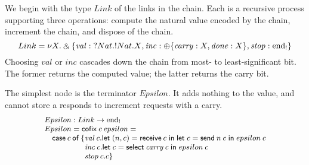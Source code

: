 \documentclass[orivec,envcountsame]{llncs}
\makeatletter
\newcommand{\with}{\mathbin\binampersand}
\newcommand{\gvout}[2]{{!#1.#2}}
\newcommand{\gvin}[2]{{?#1.#2}}
\newcommand{\outterm}{\mathrm{end}_!}
\newcommand{\mkwd}[1]{\mathsf{#1}}
\newcommand{\clabel}[1]{\mathit{#1}}
\newcommand{\gvsend}[2]{\mkwd{send}\:#1\:#2}
\newcommand{\gvreceive}[1]{\mkwd{receive}\:#1}
\newcommand{\gvlet}[3]{\mkwd{let}\;#1 = #2\;\mkwd{in}\;#3}
\newcommand{\gvselect}[2]{\mkwd{select}\:#1\:#2}
\newcommand{\lrkwd}{\mkwd{cofix}}
\newcommand{\ba}{\begin{array}}
\newcommand{\ea}{\end{array}}
\newcommand{\bl}{\ba[t]{@{}l@{}}}
\newcommand{\el}{\ea}
\makeatother
\begin{document}
We begin with the type $Link$ of the links in the chain. Each is a recursive process supporting
three operations: compute the natural value encoded by the chain, increment the chain, and dispose
of the chain.
%
\[\small
 Link = \nu X. \with \{ \clabel{val}: \gvin{Nat}{\gvout{Nat}{X}},
                        \clabel{inc}: \oplus \{ \clabel{carry}: X,
                                                \clabel{done}: X \},
                        \clabel{stop}: \outterm \}
\]
Choosing $\clabel{val}$ or $\clabel{inc}$ cascades down the chain from most- to least-significant
bit. The former returns the computed value; the latter returns the carry bit.

The simplest node is the terminator $Epsilon$. It adds nothing to the value, and cannot store a
responds to increment requests with a carry.
\[\small
\bl
Epsilon : Link \to \outterm \\
Epsilon = \lrkwd\:c\:epsilon = \\
\quad \mkwd{case}\:c\:\mkwd{of}\:\{
  \bl
  \clabel{val}\:c.
    \bl
    \gvlet{(n,c)}{\gvreceive{c}}{
    \gvlet{c}{\gvsend{n}{c}}{
    epsilon\:c}} \\
    \el \\
  \clabel{inc}\:c.
    \bl
    \gvlet{c}{\gvselect{\clabel{carry}}{c}}{
    epsilon\:c} \\
    \el \\
  \clabel{stop}\:c. c\}  \\
  \el \\
\el
\]
\end{document}
